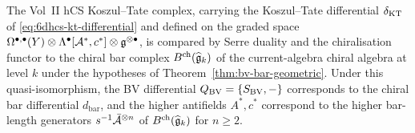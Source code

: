 \begin{theorem}
\label{thm:cfg-kt-bar-cobar}
The Vol~II hCS Koszul--Tate complex, carrying the Koszul--Tate
differential $\delta_{\mathrm{KT}}$ of \eqref{eq:6dhcs-kt-differential} and
defined on the graded space
$\Omega^{\bullet,\bullet}(Y)\otimes\Lambda^\bullet[\mathcal{A}^*,c^*]
\otimes\mathfrak{g}^{\otimes\bullet}$, is compared by Serre duality and the
chiralisation functor to the chiral bar complex
$B^{\mathrm{ch}}(\widehat{\mathfrak{g}}_k)$ of the current-algebra chiral algebra
at level $k$ under the hypotheses of
Theorem~\ref{thm:bv-bar-geometric}. Under this quasi-isomorphism, the
BV differential $Q_{\mathrm{BV}}=\{S_{\mathrm{BV}},-\}$ corresponds to the chiral bar
differential $d_{\mathrm{bar}}$, and the higher antifields
$A^*,c^*$ correspond to the higher bar-length generators
$s^{-1}\bar{\mathcal{A}}^{\otimes n}$ of $B^{\mathrm{ch}}(\widehat{\mathfrak{g}}_k)$ for
$n\geq 2$.
\end{theorem}

